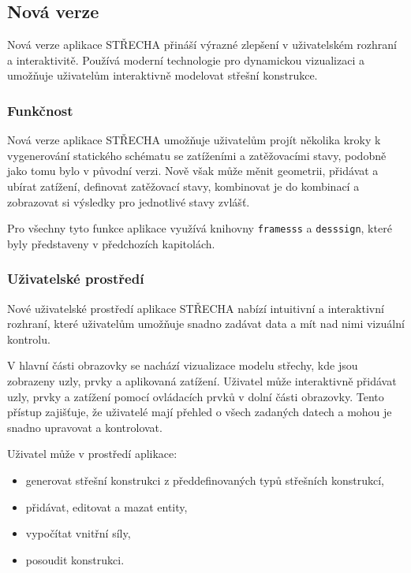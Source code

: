 \subsection{Nová verze}
Nová verze aplikace STŘECHA přináší výrazné zlepšení v uživatelském rozhraní a interaktivitě. Používá moderní technologie pro dynamickou vizualizaci a umožňuje uživatelům interaktivně modelovat střešní konstrukce.

\subsubsection*{Funkčnost}
Nová verze aplikace STŘECHA umožňuje uživatelům projít několika kroky k vygenerování statického schématu se zatíženími a zatěžovacími stavy, podobně jako tomu bylo v původní verzi. Nově však může měnit geometrii, přidávat a ubírat zatížení, definovat zatěžovací stavy, kombinovat je do kombinací a zobrazovat si výsledky pro jednotlivé stavy zvlášť.

Pro všechny tyto funkce aplikace využívá knihovny \texttt{framesss} a \texttt{desssign}, které byly představeny v předchozích kapitolách.

\subsubsection*{Uživatelské prostředí}
Nové uživatelské prostředí aplikace STŘECHA nabízí intuitivní a interaktivní rozhraní, které uživatelům umožňuje snadno zadávat data a mít nad nimi vizuální kontrolu.

V hlavní části obrazovky se nachází vizualizace modelu střechy, kde jsou zobrazeny uzly, prvky a aplikovaná zatížení. Uživatel může interaktivně přidávat uzly, prvky a zatížení pomocí ovládacích prvků v dolní části obrazovky. Tento přístup zajišťuje, že uživatelé mají přehled o všech zadaných datech a mohou je snadno upravovat a kontrolovat.

Uživatel může v prostředí aplikace:
\begin{itemize}
    \item generovat střešní konstrukci z předdefinovaných typů střešních konstrukcí,
    \item přidávat, editovat a mazat entity,
    \item vypočítat vnitřní síly,
    \item posoudit konstrukci.
\end{itemize}

